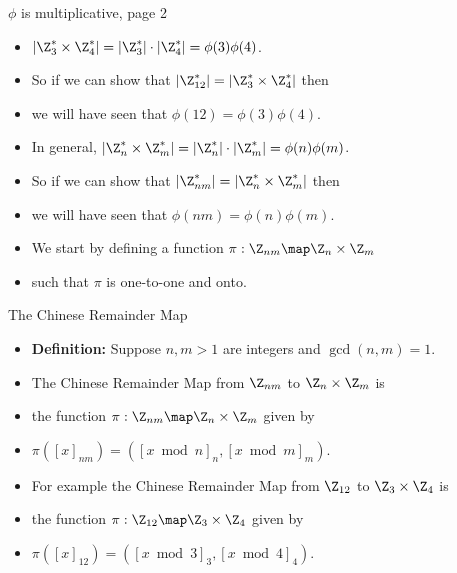 \documentclass[handout]{beamer}
\begin{document}
\begin{frame}{$\phi$ is multiplicative, page 2}

\begin{itemize}
  \item $|\Z_3^* \times \Z_4^*| = |\Z_3^*| \cdot |\Z_4^*| = \phi(3) \phi(4)$.
  \item So if we can show that $|\Z^*_{12}| =  |\Z_3^* \times \Z_4^*|$ then
  \item we will have seen that $\phi(12) = \phi(3)\phi(4)$.
  \item In general,  $|\Z_n^* \times \Z_m^*| = |\Z_n^*| \cdot |\Z_m^*| = \phi(n) \phi(m)$.
  \item So if we can show that $|\Z_{nm}^*| = |\Z_n^* \times \Z_m^*|$ then
  \item we will have seen that $\phi(nm) = \phi(n)\phi(m)$.
  \item We start by defining a function $\pi:\Z_{nm}\map \Z_n \times \Z_m$
  \item such that $\pi$ is one-to-one and onto.
\end{itemize}

\end{frame}

\begin{frame}{The Chinese Remainder Map}

\begin{itemize}
  \item \textbf{Definition:} Suppose $n,m >1$ are integers and $\gcd(n,m)=1$.
  \item The Chinese Remainder Map from $\Z_{nm}$ to $\Z_n\times \Z_m$ is
  \item the function $\pi:\Z_{nm} \map \Z_n\times \Z_m$ given by
  \item $\pi([x]_{nm}) = \left( [x\bmod n]_n, [x\bmod m]_m\right)$.
  \item For example the Chinese Remainder Map from $\Z_{12}$ to $\Z_3\times \Z_4$ is
  \item the function $\pi:\Z_{12} \map \Z_3\times \Z_4$ given by
  \item $\pi([x]_{12}) = \left( [x\bmod 3]_3, [x\bmod 4]_4\right)$.
\end{itemize}

\end{frame}
\end{document}
